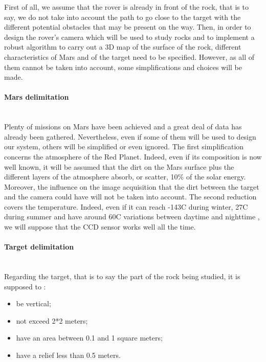 First of all, we assume that the rover is already in front of the rock, that is to say, we do not take into account the path to go close to the target with the different potential obstacles that may be present on the way. Then, in order to design the rover's camera which will be used to study rocks and to implement a robust algorithm to carry out a 3D map of the surface of the rock, different characteristics of Mars and of the target need to be specified. However, as all of them cannot be taken into account, some simplifications and choices will be made.

\paragraph*{Mars delimitation}
~\\
Plenty of missions on Mars have been achieved and a great deal of data has already been gathered. Nevertheless, even if some of them will be used to design our system, others will be simplified or even ignored.
The first simplification concerns the atmosphere of the Red Planet. Indeed, even if its composition is now well known, it will be assumed that the dirt on the Mars surface plus the different layers of the atmosphere absorb, or scatter, 10\% of the solar energy. Moreover, the influence on the image acquisition that the dirt between the target and the camera could have will not be taken into account.
The second reduction covers the temperature. Indeed, even if it can reach -143\textdegree C during winter, 27\textdegree C during summer and have around 60\textdegree C variations between daytime and nighttime \cite{wiki:temperature}, we will suppose that the CCD sensor works well all the time.


\paragraph*{Target delimitation}
~\\
Regarding the target, that is to say the part of the rock being studied, it is supposed to :
\begin{itemize}
\item be vertical;
\item not exceed 2*2 meters;
\item have an area between 0.1 and 1 square meters;
\item have a relief less than 0.5 meters.
\end{itemize}

